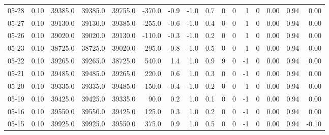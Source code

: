 \begin{threeparttable}
{\begin{tabular}{lrrrrrrrrrrrrrrr}
  05-28 &     0.10 & 39385.0 & 39385.0 & 39755.0 &     -370.0 &           -0.9 &                     -1.0 &                 0.7 &              0 &         0 &     1 &         0 &       0.00 &      0.94 &           0.00 \\
  05-27 &     0.10 & 39130.0 & 39130.0 & 39385.0 &     -255.0 &           -0.6 &                     -1.0 &                 0.4 &              0 &         0 &     1 &         0 &       0.00 &      0.94 &           0.00 \\
  05-26 &     0.10 & 39020.0 & 39020.0 & 39130.0 &     -110.0 &           -0.3 &                     -1.0 &                 0.2 &              0 &         0 &     1 &         0 &       0.00 &      0.94 &           0.00 \\
  05-23 &     0.10 & 38725.0 & 38725.0 & 39020.0 &     -295.0 &           -0.8 &                     -1.0 &                 0.5 &              0 &         0 &     1 &         0 &       0.00 &      0.94 &           0.00 \\
  05-22 &     0.10 & 39265.0 & 39265.0 & 38725.0 &      540.0 &            1.4 &                      1.0 &                 0.9 &              9 &         0 &    -1 &         0 &       0.00 &      0.94 &           0.00 \\
  05-21 &     0.10 & 39485.0 & 39485.0 & 39265.0 &      220.0 &            0.6 &                      1.0 &                 0.3 &              0 &         0 &    -1 &         0 &       0.00 &      0.94 &           0.00 \\
  05-20 &     0.10 & 39335.0 & 39335.0 & 39485.0 &     -150.0 &           -0.4 &                     -1.0 &                 0.2 &              0 &         0 &     1 &         0 &       0.00 &      0.94 &           0.00 \\
  05-19 &     0.10 & 39425.0 & 39425.0 & 39335.0 &       90.0 &            0.2 &                      1.0 &                 0.1 &              0 &         0 &    -1 &         0 &       0.00 &      0.94 &           0.00 \\
  05-16 &     0.10 & 39550.0 & 39550.0 & 39425.0 &      125.0 &            0.3 &                      1.0 &                 0.2 &              0 &         0 &    -1 &         0 &       0.00 &      0.94 &           0.00 \\
  05-15 &     0.10 & 39925.0 & 39925.0 & 39550.0 &      375.0 &            0.9 &                      1.0 &                 0.5 &              0 &         0 &    -1 &         0 &       0.00 &      0.94 &          -0.10 \\

\end{tabular}}
\end{threeparttable}

